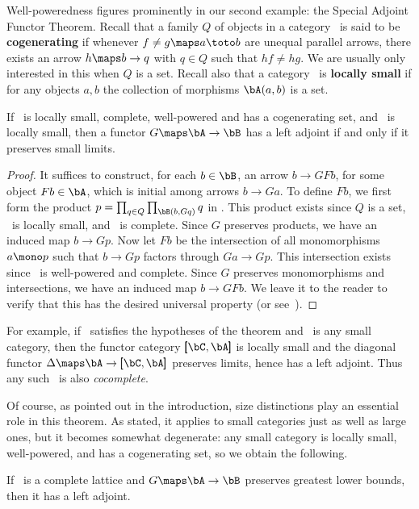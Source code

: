 \documentclass{amsart}
\begin{document}
Well-poweredness figures prominently in our second example: the
Special Adjoint Functor Theorem.  Recall that a family $Q$ of objects
in a category \bA\ is said to be \textbf{cogenerating} if whenever
$f\neq g\maps a\toto b$ are unequal parallel arrows, there exists an
arrow $h\maps b\to q$ with $q\in Q$ such that $hf\neq hg$.  We are
usually only interested in this when $Q$ is a set.  Recall also that a
category \bA\ is \textbf{locally small} if for any objects $a,b$ the
collection of morphisms $\bA(a,b)$ is a set.

\begin{thm}
  If \bA\ is locally small, complete, well-powered and has a
  cogenerating set, and \bB\ is locally small, then a functor $G\maps
  \bA\to\bB$ has a left adjoint if and only if it preserves small
  limits.
\end{thm}
\begin{proof}
  It suffices to construct, for each $b\in \bB$, an arrow $b\to GFb$,
  for some object $Fb\in \bA$, which is initial among arrows $b\to
  Ga$.  To define $Fb$, we first form the product $p=\prod_{q\in
    Q}\prod_{\bB(b,Gq)} q$ in \bA.  This product exists since $Q$ is a
  set, \bB\ is locally small, and \bA\ is complete.  Since $G$
  preserves products, we have an induced map $b\to Gp$.  Now let $Fb$
  be the intersection of all monomorphisms $a\mono p$ such that $b\to
  Gp$ factors through $Ga\to Gp$.  This intersection exists since \bA\
  is well-powered and complete.  Since $G$ preserves monomorphisms and
  intersections, we have an induced map $b\to GFb$.  We leave it to
  the reader to verify that this has the desired universal property
  (or see~\cite[V.8]{maclane}).
\end{proof}

For example, if \bA\ satisfies the hypotheses of the theorem and \bC\
is any small category, then the functor category $\pmb[\bC,\bA\pmb]$
is locally small and the diagonal functor $\Delta\maps
\bA\to\pmb[\bC,\bA\pmb]$ preserves limits, hence has a left adjoint.
Thus any such \bA\ is also \emph{cocomplete}.

Of course, as pointed out in the introduction, size distinctions play
an essential role in this theorem.  As stated, it applies to small
categories just as well as large ones, but it becomes somewhat
degenerate: any small category is locally small, well-powered, and has
a cogenerating set, so we obtain the following.

\begin{cor}
  If \bA\ is a complete lattice and $G\maps \bA\to\bB$ preserves
  greatest lower bounds, then it has a left adjoint.
\end{cor}
\end{document}
